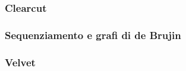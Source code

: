 \begin{frame}[fragile]
\frametitle{Clearcut}
\end{frame}

\begin{frame}[fragile]
\frametitle{Sequenziamento e grafi di de Brujin}
\end{frame}

\begin{frame}[fragile]
\frametitle{Velvet}
\end{frame}

